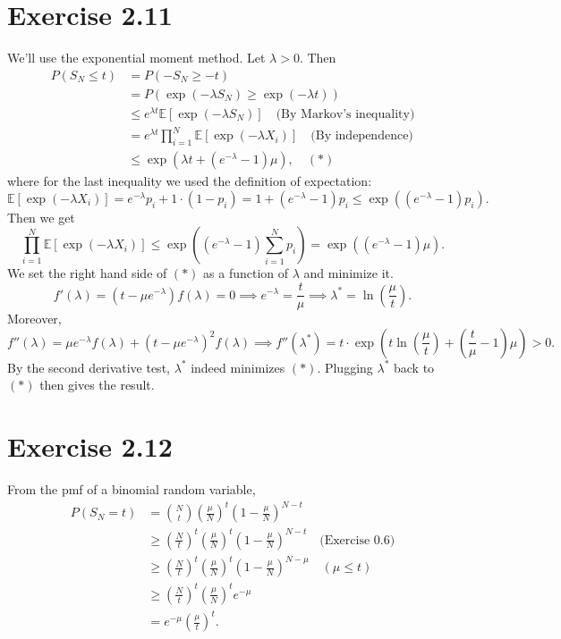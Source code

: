 \section*{Exercise 2.11}
We'll use the exponential moment method. Let $\lambda > 0$. Then 
\begin{align*}
	P(S_N \leq t) 
	&= P(-S_N \geq -t) \\
	&= P(\exp{(-\lambda S_N)} \geq \exp{(-\lambda t)}) \\
	&\leq e^{\lambda t} \mathbb{E}\left[ \exp{(-\lambda S_N)} \right] \quad \text{(By Markov's inequality)} \\
	&= e^{\lambda t} \prod_{i = 1}^{N}\mathbb{E}\left[ \exp{(-\lambda X_i)} \right] \quad 
	\text{(By independence)} \\
	&\leq \exp{(\lambda t + (e^{-\lambda} - 1) \mu)}, \quad (*)
\end{align*}
where for the last inequality we used the definition of expectation:
\[ \mathbb{E}\left[ \exp{(-\lambda X_i)} \right] 
= e^{-\lambda}p_i + 1 \cdot (1 - p_i) = 1 + (e^{-\lambda} - 1)p_i \leq \exp{((e^{-\lambda} - 1)p_i)}. \]
Then we get 
\[ \prod_{i = 1}^{N}\mathbb{E}\left[ \exp{(-\lambda X_i)} \right] 
\leq \exp{\left( (e^{-\lambda} - 1) \sum_{i = 1}^{N} p_i \right)} = \exp{((e^{-\lambda} - 1) \mu)}. \]
We set the right hand side of $(*)$ as a function of $\lambda$ and minimize it.
\[ f'(\lambda) = (t - \mu e^{-\lambda})f(\lambda) = 0 \implies e^{-\lambda} = \frac{t}{\mu} 
\implies \lambda^* = \ln{\left( \frac{\mu}{t} \right)}. \]
Moreover, 
\[ f''(\lambda) = \mu e^{-\lambda} f(\lambda) + (t - \mu e^{-\lambda})^2 f(\lambda) 
\implies f''(\lambda^*) = t \cdot \exp{\left( t \ln{\left( \frac{\mu}{t} \right)} + 
\left( \frac{t}{\mu} - 1 \right) \mu \right)} > 0. \]
By the second derivative test, $\lambda^*$ indeed minimizes $(*)$. Plugging $\lambda^*$ back to $(*)$ then 
gives the result.


\newpage
\section*{Exercise 2.12}
From the pmf of a binomial random variable, 
\begin{align*}
	P(S_N = t) 
	&= \binom{N}{t} \left( \frac{\mu}{N} \right)^t \left( 1 - \frac{\mu}{N} \right)^{N - t} \\
	&\geq \left( \frac{N}{t} \right)^t \left( \frac{\mu}{N} \right)^t 
	\left( 1 - \frac{\mu}{N} \right)^{N - t} \quad \text{(Exercise 0.6)} \\
	&\geq \left( \frac{N}{t} \right)^t \left( \frac{\mu}{N} \right)^t  
    \left( 1 - \frac{\mu}{N} \right)^{N - \mu} \quad (\mu \leq t) \\
	&\geq \left( \frac{N}{t} \right)^t \left( \frac{\mu}{N} \right)^t e^{-\mu} \\
	&= e^{-\mu} \left( \frac{\mu}{t} \right)^t.
\end{align*}


